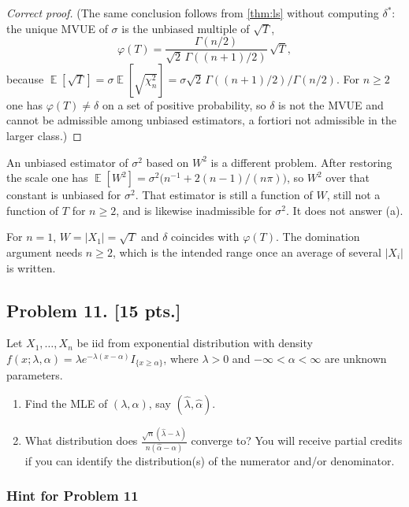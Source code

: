 \documentclass[11pt,a4paper]{article}
\DeclareMathOperator{\E}{\mathbb{E}}
\begin{document}
\begin{proof}[Correct proof]
(The same conclusion follows from \cref{thm:ls} without computing \( \delta^{*} \): the unique MVUE of \( \sigma \) is the unbiased multiple of \( \sqrt{T} \),
\[
\varphi(T)
=
\frac{\Gamma(n/2)}{\sqrt{2}\,\Gamma((n+1)/2)}\,\sqrt{T},
\]
because \( \E[\sqrt{T}]=\sigma\E[\sqrt{\chi^{2}_{n}}]=\sigma\sqrt{2}\,\Gamma((n+1)/2)/\Gamma(n/2) \). For \( n\ge 2 \) one has \( \varphi(T)\neq\delta \) on a set of positive probability, so \( \delta \) is not the MVUE and cannot be admissible among unbiased estimators, a fortiori not admissible in the larger class.)
\end{proof}

\begin{remark}
\label{rem:p10-sigma2}
An unbiased estimator of \( \sigma^{2} \) based on \( W^{2} \) is a different problem. After restoring the scale one has \( \E[W^{2}]=\sigma^{2}\bigl(n^{-1}+2(n-1)/(n\pi)\bigr) \), so \( W^{2} \) over that constant is unbiased for \( \sigma^{2} \). That estimator is still a function of \( W \), still not a function of \( T \) for \( n\ge 2 \), and is likewise inadmissible for \( \sigma^{2} \). It does not answer (a).

For \( n=1 \), \( W=|X_1|=\sqrt{T} \) and \( \delta \) coincides with \( \varphi(T) \). The domination argument needs \( n\ge 2 \), which is the intended range once an average of several \( |X_i| \) is written.
\end{remark}

\subsection{Problem 11. [15 pts.]}
Let \( X_1, \dots, X_n \) be iid from exponential distribution with density \( f(x; \lambda, \alpha) = \lambda e^{-\lambda(x-\alpha)} I_{\{x \ge \alpha\}} \), where \( \lambda > 0 \) and \( -\infty < \alpha < \infty \) are unknown parameters.
\begin{enumerate}[label=(\alph*)]
    \item Find the MLE of \( (\lambda, \alpha) \), say \( (\hat{\lambda}, \hat{\alpha}) \).
    \item What distribution does \( \frac{\sqrt{n}(\hat{\lambda} - \lambda)}{n(\hat{\alpha} - \alpha)} \) converge to? You will receive partial credits if you can identify the distribution(s) of the numerator and/or denominator.
\end{enumerate}

\setcounter{section}{11}

\subsubsection{Hint for Problem 11}
\end{document}
